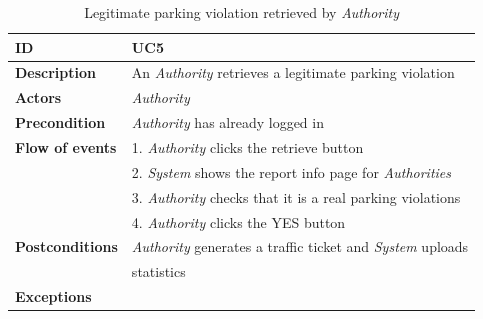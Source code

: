 \documentclass{article}
\begin{document}
\clearpage
\begin{table}
    \begin{center}
    \centering
\begin{tabular}{ | l | l |}
\hline
\textbf{ID} & UC5 \\
\hline
\textbf{Description} & An \textit{Authority} retrieves a legitimate parking violation  \\
\hline
\textbf{Actors} & \textit{Authority} \\
\hline
\textbf{Precondition} & \textit{Authority} has already logged in \\
\hline
\textbf{Flow of events} & 1. \textit{Authority} clicks the retrieve button \\
                        & 2. \textit{System} shows the report info page for \textit{Authorities} \\
                        & 3. \textit{Authority} checks that it is a real parking violations  \\
                        & 4. \textit{Authority} clicks the YES button  \\
\hline
\textbf{Postconditions} &  \textit{Authority} generates a traffic ticket and \textit{System} uploads \\ 
                        & statistics \\
\hline
\textbf{Exceptions} & \\ 
\hline
\end{tabular}
\caption{Legitimate parking violation retrieved by \textit{Authority} }
\end{center}
\end{table}
\end{document}
